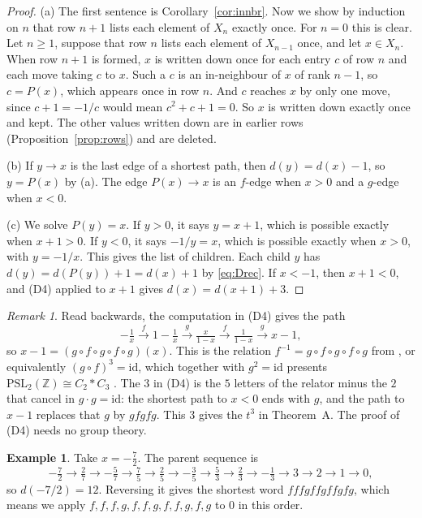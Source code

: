 \documentclass[11pt]{article}
\theoremstyle{definition}
\newtheorem{example}[theorem]{Example}
\theoremstyle{remark}
\newtheorem{remark}[theorem]{Remark}
\newcommand{\Z}{\mathbb{Z}}
\begin{document}
\begin{proof}
(a) The first sentence is Corollary~\ref{cor:innbr}. Now we show by induction on $n$ that row
$n+1$ lists each element of $X_n$ exactly once. For $n=0$ this is clear. Let $n\ge1$, suppose that
row $n$ lists each element of $X_{n-1}$ once, and let $x\in X_n$. When row $n+1$ is formed, $x$ is
written down once for each entry $c$ of row $n$ and each move taking $c$ to $x$. Such a $c$ is an
in-neighbour of $x$ of rank $n-1$, so $c=P(x)$, which appears once in row $n$. And $c$ reaches $x$
by only one move, since $c+1=-1/c$ would mean $c^2+c+1=0$. So $x$ is written down exactly once and
kept. The other values written down are in earlier rows (Proposition~\ref{prop:rows}) and are
deleted.

(b) If $y\to x$ is the last edge of a shortest path, then $d(y)=d(x)-1$, so $y=P(x)$ by (a). The
edge $P(x)\to x$ is an $f$-edge when $x>0$ and a $g$-edge when $x<0$.

(c) We solve $P(y)=x$. If $y>0$, it says $y=x+1$, which is possible exactly when $x+1>0$. If $y<0$,
it says $-1/y=x$, which is possible exactly when $x>0$, with $y=-1/x$. This gives the list of
children. Each child $y$ has $d(y)=d(P(y))+1=d(x)+1$ by \eqref{eq:Drec}. If $x<-1$, then $x+1<0$,
and (D4) applied to $x+1$ gives $d(x)=d(x+1)+3$.
\end{proof}

\begin{remark}\label{rem:relation}
Read backwards, the computation in (D4) gives the path
\[
-\tfrac1x \xrightarrow{\,f\,} 1-\tfrac1x \xrightarrow{\,g\,} \tfrac{x}{1-x}
\xrightarrow{\,f\,} \tfrac{1}{1-x} \xrightarrow{\,g\,} x-1 ,
\]
so $x-1=(g\circ f\circ g\circ f\circ g)(x)$. This is the relation $f^{-1}=g\circ f\circ g\circ f\circ g$
from \cite{kagey137}, or equivalently $(g\circ f)^3=\mathrm{id}$, which together with
$g^2=\mathrm{id}$ presents $\mathrm{PSL}_2(\Z)\cong C_2*C_3$ \cite{serre1980,alperin1993}. The $3$ in
(D4) is the $5$ letters of the relator minus the $2$ that cancel in $g\cdot g=\mathrm{id}$: the
shortest path to $x<0$ ends with $g$, and the path to $x-1$ replaces that $g$ by $gfgfg$. This $3$
gives the $t^3$ in Theorem~A. The proof of (D4) needs no group theory.
\end{remark}

\begin{example}\label{ex:orbit}
Take $x=-\tfrac72$. The parent sequence is
\[
-\tfrac72 \to \tfrac27 \to -\tfrac57 \to \tfrac75 \to \tfrac25 \to -\tfrac35 \to \tfrac53 \to \tfrac23
\to -\tfrac13 \to 3 \to 2 \to 1 \to 0,
\]
so $d(-7/2)=12$. Reversing it gives the shortest word $fffgffgffgfg$, which means we apply
$f,f,f,g,f,f,g,f,f,g,f,g$ to $0$ in this order.
\end{example}
\end{document}
